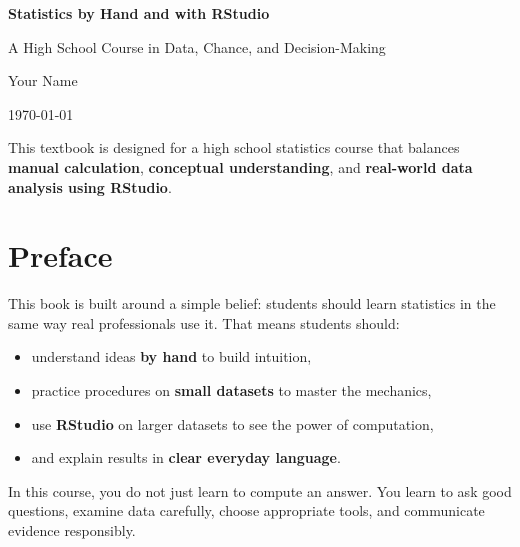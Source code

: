 \documentclass[11pt,openany]{book}
\begin{document}
\frontmatter

\begin{titlepage}
    \centering
    \vspace*{1.5cm}
    {\Huge \bfseries Statistics by Hand and with RStudio\par}
    \vspace{0.6cm}
    {\Large A High School Course in Data, Chance, and Decision-Making\par}
    \vspace{1.5cm}
    {\large Your Name\par}
    \vspace{0.5cm}
    {\large \today\par}
    \vfill
    \begin{tcolorbox}[colback=lightgray,colframe=black!60,width=0.85\textwidth]
    This textbook is designed for a high school statistics course that balances
    \textbf{manual calculation}, \textbf{conceptual understanding}, and
    \textbf{real-world data analysis using RStudio}.
    \end{tcolorbox}
    \vfill
\end{titlepage}

\tableofcontents

\chapter*{Preface}
This book is built around a simple belief: students should learn statistics in the same way real professionals use it. That means students should:
\begin{itemize}
    \item understand ideas \textbf{by hand} to build intuition,
    \item practice procedures on \textbf{small datasets} to master the mechanics,
    \item use \textbf{RStudio} on larger datasets to see the power of computation,
    \item and explain results in \textbf{clear everyday language}.
\end{itemize}

In this course, you do not just learn to compute an answer. You learn to ask good questions, examine data carefully, choose appropriate tools, and communicate evidence responsibly.
\end{document}
